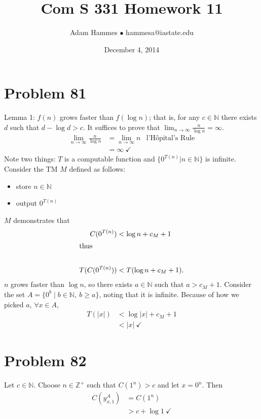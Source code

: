 \documentclass[11pt]{article}
\let\imp\rightarrow
\begin{document}
\title{Com S 331 Homework 11}
\author{Adam Hammes $\bullet$ hammesa@iastate.edu}
\date{December 4, 2014}
\maketitle


\section*{Problem 81}

Lemma 1: $f(n)$ grows faster than $f( \log n)$; that is, for any $c \in \mathbb{N}$ there exists $d$ such that $d - \log d > c$. 
It suffices to prove that $\lim _{n \imp \infty} \frac{n}{\log n}= \infty$.
	\begin{align*}
		\lim _{n \imp \infty} \frac{n}{\log n}  &= \lim _{n \imp \infty} n &\text{l'H\^{o}pital's Rule} \\
		&= \infty \ \checkmark
	\end{align*}
Note two things: $T$ is a computable function and $\{ 0^{T(n)} | n \in \mathbb{N} \}$ is infinite.
Consider the TM $M$ defined as follows:
	\begin{itemize}
		\item store $n \in \mathbb{N}$
		\item output $0^{T(n)}$
	\end{itemize}
$M$ demonstrates that
	\begin{align*}
		C( 0^{T(n)} ) &< \log n + c_M + 1 \\
		\intertext{thus} \\
		T( C( 0^{T(n)}) ) &< T( \log n + c_M +1 ).
	\end{align*}
$n$ grows faster than $\log n$, so there exists $a \in \mathbb{N}$ such that $a > c_M + 1$.
Consider the set $A = \{ 0^b \mid b \in \mathbb{N},\ b \geq a \}$, noting that it is infinite.
Because of how we picked $a$, $\forall x \in A$,
	\begin{align*}
		T(|x|) &< \log |x| + c_M + 1 \\
		&< |x| \ \checkmark
	\end{align*}


\section*{Problem 82}

Let $c \in \mathbb{N}$. Choose $n \in \mathbb{Z}^+$ such that $C(1^n) > c$ and let $x = 0^n$.
Then
	\begin{align*}
		C(y_{x,1} ^A) &= C(1^n) \\
		&> c + \log 1 \ \checkmark
	\end{align*}
\end{document}
